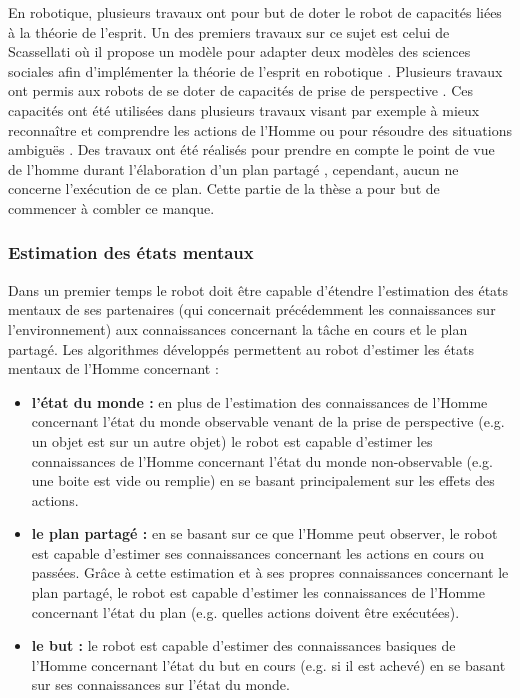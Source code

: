 \documentclass[english,a4paper,11pt,twoside]{StyleThese}
\begin{document}
En robotique, plusieurs travaux ont pour but de doter le robot de capacités liées à la théorie de l'esprit. Un des premiers travaux sur ce sujet est celui de Scassellati où il propose un modèle pour adapter deux modèles des sciences sociales \cite{leslie1984spatiotemporal, baron1997mindblindness} afin d'implémenter la théorie de l'esprit en robotique \cite{scassellati2002theory}. Plusieurs travaux ont permis aux robots de se doter de capacités de prise de perspective \cite{berlin2006perspective, hiatt2010cognitive, milliez2014framework}. Ces capacités ont été utilisées dans plusieurs travaux visant par exemple à mieux reconnaître et comprendre les actions de l'Homme \cite{johnson2005perceptual, baker2014modeling, nagai2015probabilistic} ou pour résoudre des situations ambiguës \cite{breazeal2006using}. Des travaux ont été réalisés pour prendre en compte le point de vue de l'homme durant l'élaboration d'un plan partagé \cite{warnier2012robot}, cependant, aucun ne concerne l'exécution de ce plan. Cette partie de la thèse a pour but de commencer à combler ce manque.

\subsubsection{Estimation des états mentaux}

Dans un premier temps le robot doit être capable d'étendre l'estimation des états mentaux de ses partenaires (qui concernait précédemment les connaissances sur l'environnement) aux connaissances concernant la tâche en cours et le plan partagé. Les algorithmes développés permettent au robot d'estimer les états mentaux de l'Homme concernant :
\begin{itemize}
\item \textbf{l'état du monde :} en plus de l'estimation des connaissances de l'Homme concernant l'état du monde observable venant de la prise de perspective (e.g. un objet est sur un autre objet) le robot est capable d'estimer les connaissances de l'Homme concernant l'état du monde non-observable (e.g. une boite est vide ou remplie) en se basant principalement sur les effets des actions.
\item \textbf{le plan partagé :} en se basant sur ce que l'Homme peut observer, le robot est capable d'estimer ses connaissances concernant les actions en cours ou passées. Grâce à cette estimation et à ses propres connaissances concernant le plan partagé, le robot est capable d'estimer les connaissances de l'Homme concernant l'état du plan (e.g. quelles actions doivent être exécutées).
\item \textbf{le but :} le robot est capable d'estimer des connaissances basiques de l'Homme concernant l'état du but en cours (e.g. si il est achevé) en se basant sur ses connaissances sur l'état du monde.
\end{itemize}
\end{document}
